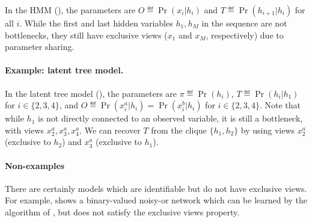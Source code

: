 In the HMM (), the parameters
are $O \eqdef \Pr(x_i|h_i)$ and $T \eqdef \Pr(h_{i+1} | h_i)$
for all $i$.
While the first and last hidden variables $h_1, h_M$ in the
  sequence are not bottlenecks, they still have exclusive views ($x_1$ and
  $x_M$, respectively)
  due to parameter sharing.

\paragraph{Example: latent tree model.}

In the latent tree model (), the parameters
are $\pi \eqdef \Pr(h_i)$, $T \eqdef \Pr(h_i | h_1)$ for $i \in \{2,3,4\}$,
and $O \eqdef \Pr(x^a_i | h_i) = \Pr(x^b_i | h_i)$ for $i \in \{2,3,4\}$.
Note that while $h_1$ is not directly connected to an observed variable,
  it is still a bottleneck, with views $x^a_2, x^a_3, x^a_4$.
We can recover $T$ from the clique $\{h_1, h_2\}$ by using views $x^a_2$
  (exclusive to $h_2$) and $x^a_3$ (exclusive to $h_1$).

\paragraph{Non-examples}
\label{sec:non-example}

There are certainly models which are identifiable but do not have exclusive views.
For example,  shows
  a binary-valued noisy-or network which can be
  learned by the algorithm of \citet{halpern13noisyor},
  but does not satisfy the exclusive views property.



